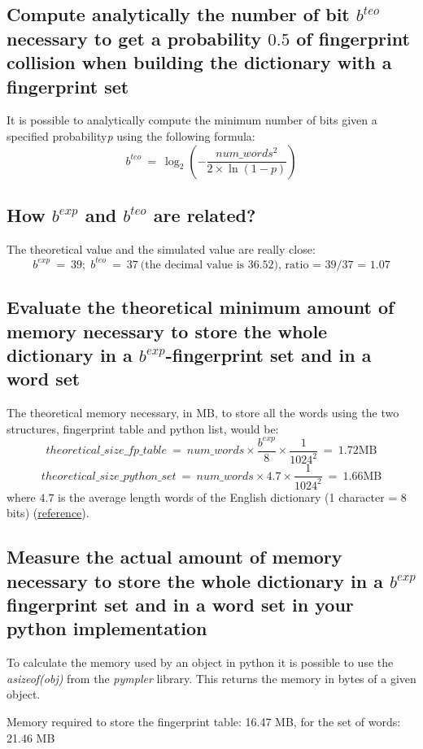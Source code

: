 \documentclass{report}
\begin{document}
{			\subsection{Compute analytically the number of bit $b^{teo}$ necessary to get a probability $0.5$ of fingerprint collision when building the dictionary with a fingerprint set}
					It is possible to analytically compute the minimum number of bits given a specified probability\emph{p} using the following formula:
					\[
							b^{teo} \: = \: \log_2{ \left( - \frac{num\_words^2}{2\times \ln\left({1-p}\right)} \right)}
					\]
					
			\subsection{How $b^{exp}$ and $b^{teo}$ are related?}
					The theoretical value and the simulated value are really close: 
					\[
							b^{exp} \: = \: 39; \; 	b^{teo} \: = \: 37 \: \text{(the decimal value is 36.52), ratio = 39/37 = 1.07}
					\]
			
			\subsection{Evaluate the theoretical minimum amount of memory necessary to store the whole dictionary in a $b^{exp}$-fingerprint set and in a word set}
			The theoretical memory necessary, in MB, to store all the words using the two structures, fingerprint table and python list, would be:
			\[ theoretical\_size\_fp\_table \: = \: num\_words \times \frac{b^{exp}}{8} \times \frac{1}{1024^2}\: = \: 1.72 \text{MB}\] 
			\[ theoretical\_size\_python\_set \: = \: num\_words \times 4.7 \times \frac{1}{1024^2} \: = \: 1.66 \text{MB}\] 
			where $4.7$ is the average length words of the English dictionary (1 character = 8 bits) (\href{http://norvig.com/mayzner.html}{reference}).
						
			\subsection{Measure the actual amount of memory necessary to store the whole dictionary in a $b^{exp}$ fingerprint set and in a word set in your python implementation}
			To calculate the memory used by an object in python it is possible to use the \emph{asizeof(obj)} from the \emph{pympler} library. This returns the memory in bytes of a given object.
			\begin{center}
					Memory required to store the fingerprint table: 16.47 MB, for the set of words: 21.46 MB
			\end{center}
			
}
\end{document}
